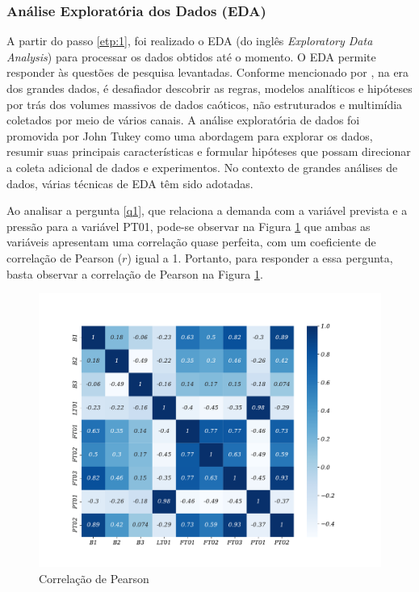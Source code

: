 \subsubsection{An\'alise Explorat\'oria dos Dados (EDA)}

A partir do passo \ref{etp:1}, foi realizado o EDA (do inglês \textit{Exploratory Data Analysis}) para processar os dados obtidos até o momento. O EDA permite responder às questões de pesquisa levantadas. Conforme mencionado por , na era dos grandes dados, é desafiador descobrir as regras, modelos analíticos e hipóteses por trás dos volumes massivos de dados caóticos, não estruturados e multimídia coletados por meio de vários canais. A análise exploratória de dados foi promovida por John Tukey como uma abordagem para explorar os dados, resumir suas principais características e formular hipóteses que possam direcionar a coleta adicional de dados e experimentos. No contexto de grandes análises de dados, várias técnicas de EDA têm sido adotadas.

Ao analisar a pergunta \ref{q1}, que relaciona a demanda com a variável prevista e a pressão para a variável PT01, pode-se observar na Figura \ref{fig:person} que ambas as variáveis apresentam uma correlação quase perfeita, com um coeficiente de correlação de Pearson ($r$) igual a 1. Portanto, para responder a essa pergunta, basta observar a correlação de Pearson na Figura \ref{fig:person}.

\begin{figure}[H]
	\centering
	\caption{Correlação de Pearson}
	\label{fig:person}
	\includegraphics[width=0.9\linewidth]{Apendices/Figuras/modelagem-24h/person}
	
\end{figure}


